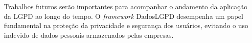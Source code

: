 \documentclass[
	12pt,				%
	openright,			%
	oneside,			%
	a4paper,			%
	english,			%
	french,				%
	spanish,			%
	brazil,				%
	]{abntex2}
\begin{document}
Trabalhos futuros serão importantes para acompanhar o andamento da aplicação da LGPD ao longo do tempo. O \textit{framework} DadosLGPD desempenha um papel fundamental na proteção da privacidade e segurança dos usuários, evitando o uso indevido de dados pessoais armazenados pelas empresas.





% 

\postextual




%
%








\printindex
\end{document}
